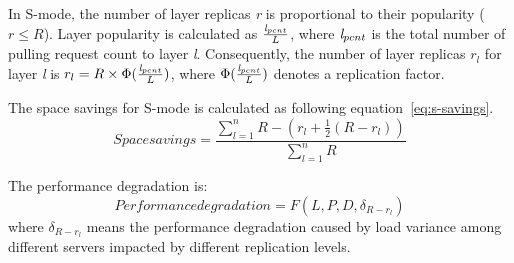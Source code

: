 In S-mode, the number of layer replicas \emph{r} is proportional to their popularity ($r \leq R$).
Layer popularity is calculated as $\frac{\emph{l}_{pcnt}}{L}$, 
where $\emph{l}_{pcnt}$ is the total number of pulling request count to layer \emph{l}.  
Consequently, the number of layer replicas $r_{l}$ for layer \emph{l} is
$r_{l} = R \times \Phi (\frac{\emph{l}_{pcnt}}{L})$, 
where $\Phi (\frac{\emph{l}_{pcnt}}{L})$ denotes a replication factor.

The space savings for S-mode is calculated as following equation~\ref{eq:s-savings}.
\begin{equation}\label{eq:s-savings}
Space savings = \frac{\sum\limits_{l=1}^n{R-(r_{l}+\frac{1}{2}(R-r_{l}))}}{\sum\limits_{l=1}^n{R}} 
\end{equation}

The performance degradation is:
  \begin{equation}\label{eq:s-pull}
Performance degradation =  F(L, P, D, \delta_{R-r_{l}})
 \end{equation}
where $\delta_{R-r_{l}}$ means 
the performance degradation caused by load variance among different servers impacted by different replication levels.
 